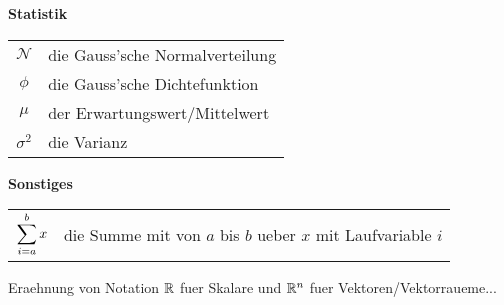 \begin{center}\textbf{Statistik}\end{center}
\begin{tabular}{cl}
  $\mathcal{N}$ & die Gauss'sche Normalverteilung \\
  $\phi$ & die Gauss'sche Dichtefunktion \\
  $\mu$ & der Erwartungswert/Mittelwert \\
  $\sigma^2$ & die Varianz
\end{tabular}

\begin{center}\textbf{Sonstiges}\end{center}
\begin{tabular}{cl}
  $\displaystyle\sum_{i=a}^b x$ & die Summe mit von $a$ bis $b$ ueber $x$ mit Laufvariable $i$ \\
\end{tabular}

Eraehnung von Notation $\mathbb{R}$ fuer Skalare und $\mathbb{R}^n$ fuer Vektoren/Vektorraueme...

